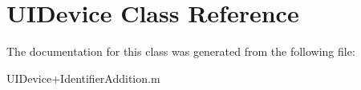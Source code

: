 \hypertarget{class_u_i_device}{
\section{\-U\-I\-Device \-Class \-Reference}
\label{class_u_i_device}
}


\-The documentation for this class was generated from the following file\-:\begin{DoxyCompactItemize}
\item 
\-U\-I\-Device+\-Identifier\-Addition.\-m\end{DoxyCompactItemize}
